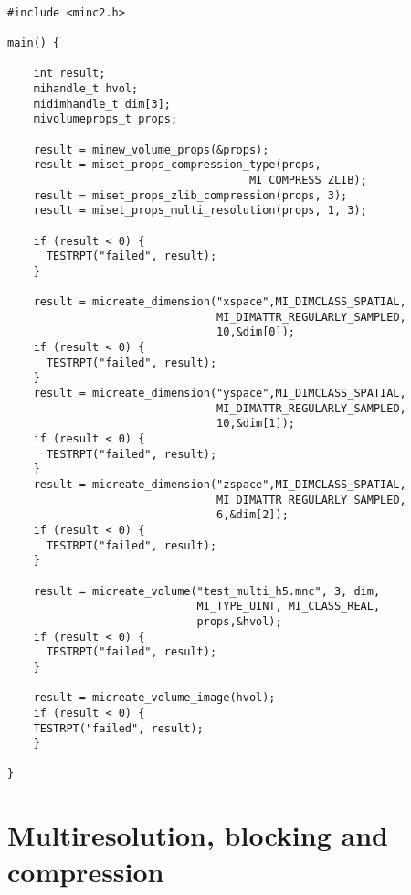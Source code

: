 \documentclass{article}
\begin{document}
\begin{verbatim}

#include <minc2.h>

main() {

    int result;
    mihandle_t hvol;
    midimhandle_t dim[3];
    mivolumeprops_t props;

    result = minew_volume_props(&props);
    result = miset_props_compression_type(props, 
                                     MI_COMPRESS_ZLIB);
    result = miset_props_zlib_compression(props, 3);
    result = miset_props_multi_resolution(props, 1, 3);
    
    if (result < 0) {
      TESTRPT("failed", result);
    }
  
    result = micreate_dimension("xspace",MI_DIMCLASS_SPATIAL,
                                MI_DIMATTR_REGULARLY_SAMPLED, 
                                10,&dim[0]);
    if (result < 0) {
      TESTRPT("failed", result);
    }
    result = micreate_dimension("yspace",MI_DIMCLASS_SPATIAL,
                                MI_DIMATTR_REGULARLY_SAMPLED, 
                                10,&dim[1]);
    if (result < 0) {
      TESTRPT("failed", result);
    }
    result = micreate_dimension("zspace",MI_DIMCLASS_SPATIAL,
                                MI_DIMATTR_REGULARLY_SAMPLED, 
                                6,&dim[2]);
    if (result < 0) {
      TESTRPT("failed", result);
    }

    result = micreate_volume("test_multi_h5.mnc", 3, dim, 
                             MI_TYPE_UINT, MI_CLASS_REAL,
                             props,&hvol);
    if (result < 0) {
      TESTRPT("failed", result);
    }

    result = micreate_volume_image(hvol);
    if (result < 0) {
    TESTRPT("failed", result);
    }
   
}

\end{verbatim}

\section{Multiresolution, blocking and compression}
\end{document}
